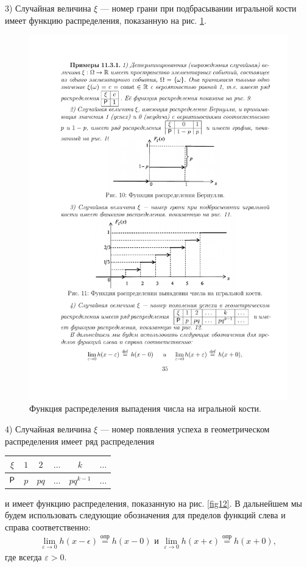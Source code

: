 3) Случайная величина $\xi$ — номер грани при подбрасывании игральной
кости имеет функцию распределения, показанную на рис. \ref{fig11}.
\begin{figure}[H]
	\centering
	\includegraphics[]{pic/pic11}
	\caption{Функция распределения выпадения числа на игральной кости.}
	\label{fig11}
\end{figure}

4) Случайная величина $\xi$ — номер появления успеха в геометрическом
распределения имеет ряд распределения 
\begin{tabular}{|c|c|c|c|c|c|}
\hline
$\xi$ & $1$ & $2$ & $\dots$ & $k$ & $\dots$\\ \hline
$\P$ & $p$ & $pq$ & $\dots$ & $pq^{k-1}$ & $\dots$\\ \hline
\end{tabular}
и имеет функцию распределения, показанную на рис. \ref{fig12}.
В дальнейшем мы будем использовать следующие обозначения для пределов функций слева и справа соответственно:
\begin{gather*}
	\lim_{\varepsilon\to 0}h(x-\epsilon)\stackrel{\text{опр}}{=}h(x-0) \,\, \text{и} \,\,
	\lim_{\varepsilon\to 0}h(x+\epsilon)\stackrel{\text{опр}}{=}h(x+0),
\end{gather*}
где всегда $\varepsilon >0$.

